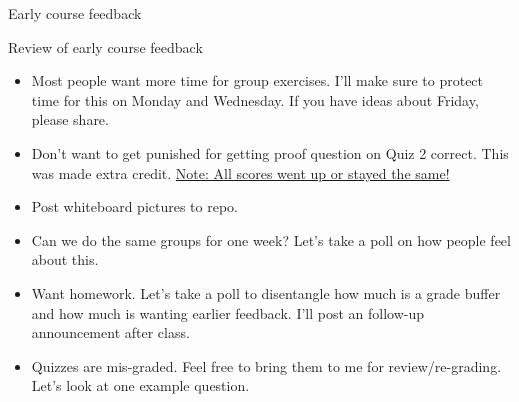 \documentclass[10pt]{beamer}
\begin{document}
\begin{frame}[standout]

Early course feedback
	
\end{frame}



\begin{frame}{Review of early course feedback}

\begin{itemize}
	\item Most people want more time for group exercises.  \pause \alert{I'll make sure to protect time for this on Monday and Wednesday. If you have ideas about Friday, please share.} \pause  
	\item Don't want to get punished for getting proof question on Quiz 2 correct.  \pause \alert{This was made extra credit.} \pause  \alert{\underline{Note: All scores went up or stayed the same!}} \pause 
	\item Post whiteboard pictures to repo. \pause \greencheck \pause 
	\item Can we do the same groups for one week? \pause \alert{Let's take a poll on how people feel about this.}
	\item Want homework.  \pause \alert{Let's take a poll to disentangle how much is a grade buffer and how much is wanting earlier feedback.} \pause \alert{I'll post an follow-up announcement after class.}
	\item Quizzes are mis-graded. \pause \alert{Feel free to bring them to me for review/re-grading.} \pause  \alert{Let's look at one example question.} \pause 
\end{itemize}
\end{frame}

\end{document}
